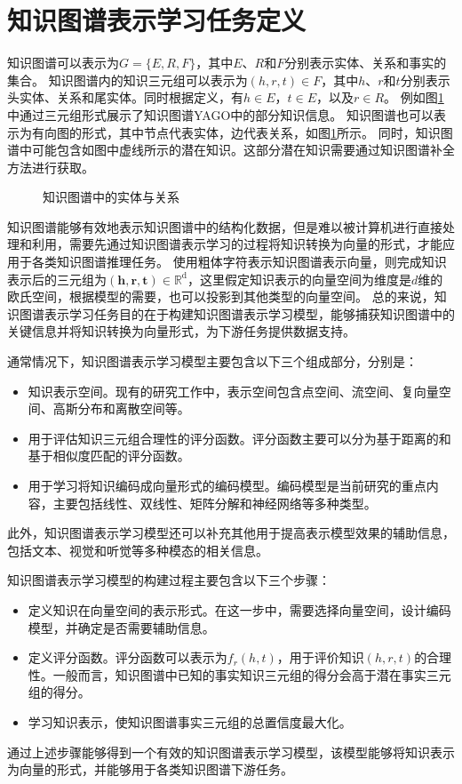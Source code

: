 \documentclass[algorithmlist, AutoFakeBold, AutoFakeSlant, figurelist, tablelist, nomlist, engineering]{seuthesix}
\begin{document}
\section{知识图谱表示学习任务定义}
知识图谱可以表示为$G=\{E, R, F\}$，其中$E$、$R$和$F$分别表示实体、关系和事实的集合。
知识图谱内的知识三元组可以表示为$(h, r, t) \in F$，其中$h$、$r$和$t$分别表示头实体、关系和尾实体。同时根据定义，有$h \in E$，$t \in E$，以及$r \in R$。
例如图\ref{2_KG}中通过三元组形式展示了知识图谱YAGO中的部分知识信息。
知识图谱也可以表示为有向图的形式，其中节点代表实体，边代表关系，如图\ref{2_KG}所示。
同时，知识图谱中可能包含如图中虚线所示的潜在知识。这部分潜在知识需要通过知识图谱补全方法进行获取。
\begin{figure}[H]
  \centering
  \caption{知识图谱中的实体与关系}
  \label{2_KG}
\end{figure}

知识图谱能够有效地表示知识图谱中的结构化数据，但是难以被计算机进行直接处理和利用，需要先通过知识图谱表示学习的过程将知识转换为向量的形式，才能应用于各类知识图谱推理任务。
使用粗体字符表示知识图谱表示向量，则完成知识表示后的三元组为$\left(\bm{h}, \bm{r}, \bm{t}\right) \in \mathbb{R}^{\mathrm{d}}$，这里假定知识表示的向量空间为维度是$d$维的欧氏空间，根据模型的需要，也可以投影到其他类型的向量空间。
总的来说，知识图谱表示学习任务目的在于构建知识图谱表示学习模型，能够捕获知识图谱中的关键信息并将知识转换为向量形式，为下游任务提供数据支持。

通常情况下，知识图谱表示学习模型主要包含以下三个组成部分，分别是：
\begin{itemize}
  \item [1)] 知识表示空间。现有的研究工作中，表示空间包含点空间、流空间、复向量空间、高斯分布和离散空间等。
  \item [2)] 用于评估知识三元组合理性的评分函数。评分函数主要可以分为基于距离的和基于相似度匹配的评分函数。
  \item [3)] 用于学习将知识编码成向量形式的编码模型。编码模型是当前研究的重点内容，主要包括线性、双线性、矩阵分解和神经网络等多种类型。
\end{itemize}
此外，知识图谱表示学习模型还可以补充其他用于提高表示模型效果的辅助信息，包括文本、视觉和听觉等多种模态的相关信息。

知识图谱表示学习模型的构建过程主要包含以下三个步骤：
\begin{itemize}
  \item [1)] 定义知识在向量空间的表示形式。在这一步中，需要选择向量空间，设计编码模型，并确定是否需要辅助信息。
  \item [2)] 定义评分函数。评分函数可以表示为$f_r(h, t)$，用于评价知识$(h, r, t)$的合理性。一般而言，知识图谱中已知的事实知识三元组的得分会高于潜在事实三元组的得分。
  \item [3)] 学习知识表示，使知识图谱事实三元组的总置信度最大化。
\end{itemize}
通过上述步骤能够得到一个有效的知识图谱表示学习模型，该模型能够将知识表示为向量的形式，并能够用于各类知识图谱下游任务。
\end{document}
